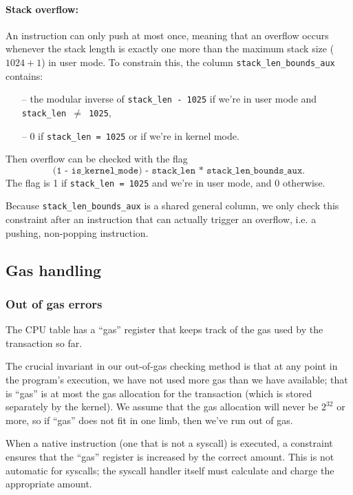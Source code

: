 \paragraph*{Stack overflow:}
An instruction can only push at most once, meaning that an overflow occurs whenever the stack length is exactly one more than the maximum stack size ($1024+1$) in user mode.
To constrain this, the column \texttt{stack\_len\_bounds\_aux} contains:

\begin{itemize}
  \item[--] the modular inverse of \texttt{stack\_len - 1025} if we're in user mode and \texttt{stack\_len $\neq$ 1025},
  \item[--] 0 if \texttt{stack\_len = 1025} or if we're in kernel mode.
\end{itemize}
Then overflow can be checked with the flag
$$\texttt{(1 - is\_kernel\_mode) - stack\_len * stack\_len\_bounds\_aux}.$$
The flag is 1 if \texttt{stack\_len = 1025} and we're in user mode, and 0 otherwise.

Because \texttt{stack\_len\_bounds\_aux} is a shared general column, we only check this constraint after an instruction that can actually trigger an overflow,
i.e. a pushing, non-popping instruction.

\subsection{Gas handling}

\subsubsection{Out of gas errors}

The CPU table has a ``gas'' register that keeps track of the gas used by the transaction so far.

The crucial invariant in our out-of-gas checking method is that at any point in the program's execution, we have not used more gas than we have available; that is ``gas'' is at most the gas allocation for the transaction (which is stored separately by the kernel). We assume that the gas allocation will never be $2^{32}$ or more, so if ``gas'' does not fit in one limb, then we've run out of gas.

When a native instruction (one that is not a syscall) is executed, a constraint ensures that the ``gas'' register is increased by the correct amount. This is not automatic for syscalls; the syscall handler itself must calculate and charge the appropriate amount.

